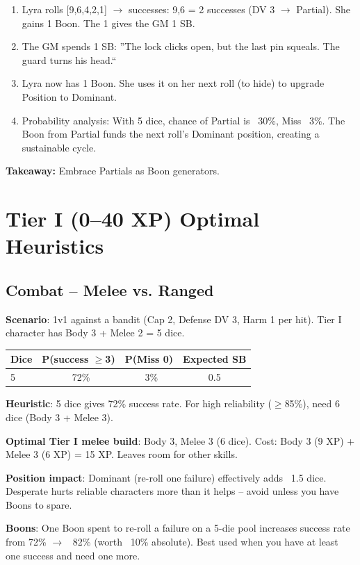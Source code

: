 \documentclass[11pt]{article}
\begin{document}
\begin{enumerate}
    \item Lyra rolls [9,6,4,2,1] $\rightarrow$ successes: 9,6 = 2 successes (DV 3 $\rightarrow$ Partial). She gains 1 Boon. The 1 gives the GM 1 SB.
    \item The GM spends 1 SB: ''The lock clicks open, but the last pin squeals. The guard turns his head.``
    \item Lyra now has 1 Boon. She uses it on her next roll (to hide) to upgrade Position to Dominant.
    \item Probability analysis: With 5 dice, chance of Partial is ~30\%, Miss ~3\%. The Boon from Partial funds the next roll's Dominant position, creating a sustainable cycle.
\end{enumerate}
\textbf{Takeaway:} Embrace Partials as Boon generators.

\section{Tier I (0--40 XP) Optimal Heuristics}

\subsection{Combat -- Melee vs. Ranged}
\textbf{Scenario}: 1v1 against a bandit (Cap 2, Defense DV 3, Harm 1 per hit). Tier I character has Body 3 + Melee 2 = 5 dice.

\begin{table}[h]
\centering
\begin{tabular}{lccc}
\toprule
\textbf{Dice} & \textbf{P(success $\geq$3)} & \textbf{P(Miss 0)} & \textbf{Expected SB} \\
\midrule
5 & ~72\% & ~3\% & 0.5 \\
\bottomrule
\end{tabular}
\end{table}

\textbf{Heuristic}: 5 dice gives 72\% success rate. For high reliability ($\geq$85\%), need 6 dice (Body 3 + Melee 3).

\textbf{Optimal Tier I melee build}: Body 3, Melee 3 (6 dice). Cost: Body 3 (9 XP) + Melee 3 (6 XP) = 15 XP. Leaves room for other skills.

\textbf{Position impact}: Dominant (re-roll one failure) effectively adds ~1.5 dice. Desperate hurts reliable characters more than it helps -- avoid unless you have Boons to spare.

\textbf{Boons}: One Boon spent to re-roll a failure on a 5-die pool increases success rate from 72\% $\rightarrow$ ~82\% (worth ~10\% absolute). Best used when you have at least one success and need one more.
\end{document}
